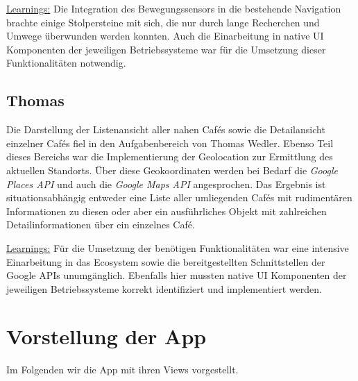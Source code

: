 \underline{Learnings:}
Die Integration des Bewegungssensors in die bestehende Navigation brachte einige Stolpersteine mit sich, die nur durch lange Recherchen und Umwege überwunden werden konnten.
Auch die Einarbeitung in native UI Komponenten der jeweiligen Betriebssysteme war für die Umsetzung dieser Funktionalitäten notwendig.

\subsection{Thomas}
Die Darstellung der Listenansicht aller nahen Cafés sowie die Detailansicht einzelner Cafés fiel in den Aufgabenbereich von Thomas Wedler.
Ebenso Teil dieses Bereichs war die Implementierung der Geolocation zur Ermittlung des aktuellen Standorts.
Über diese Geokoordinaten werden bei Bedarf die \emph{Google Places API} und auch die \emph{Google Maps API} angesprochen.
Das Ergebnis ist situationsabhängig entweder eine Liste aller umliegenden Cafés mit rudimentären Informationen zu diesen oder aber ein ausführliches Objekt mit zahlreichen Detailinformationen über ein einzelnes Café.

\underline{Learnings:}
Für die Umsetzung der benötigen Funktionalitäten war eine intensive Einarbeitung in das Ecosystem sowie die bereitgestellten Schnittstellen der Google APIs unumgänglich.
Ebenfalls hier mussten native UI Komponenten der jeweiligen Betriebssysteme korrekt identifiziert und implementiert werden.

\newpage

\section{Vorstellung der App}
Im Folgenden wir die App mit ihren Views vorgestellt.
\nopagebreak


